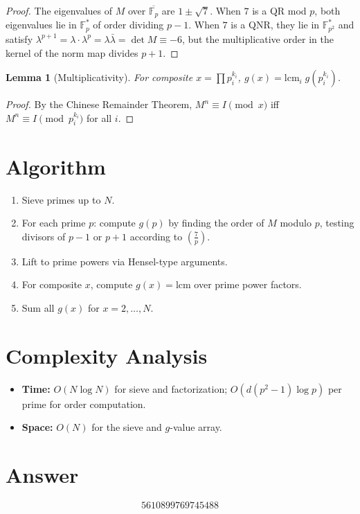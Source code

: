 \documentclass[12pt]{article}
\newtheorem{lemma}[theorem]{Lemma}
\begin{document}
\begin{proof}
The eigenvalues of $M$ over $\overline{\mathbb{F}_p}$ are $1 \pm \sqrt{7}$. When $7$ is a QR mod $p$, both eigenvalues lie in $\mathbb{F}_p^*$ of order dividing $p-1$. When $7$ is a QNR, they lie in $\mathbb{F}_{p^2}^*$ and satisfy $\lambda^{p+1} = \lambda \cdot \lambda^p = \lambda \bar{\lambda} = \det M \equiv -6$, but the multiplicative order in the kernel of the norm map divides $p+1$.
\end{proof}

\begin{lemma}[Multiplicativity]
For composite $x = \prod p_i^{k_i}$, $g(x) = \mathrm{lcm}_i\; g(p_i^{k_i})$.
\end{lemma}

\begin{proof}
By the Chinese Remainder Theorem, $M^n \equiv I \pmod{x}$ iff $M^n \equiv I \pmod{p_i^{k_i}}$ for all $i$.
\end{proof}

\section{Algorithm}

\begin{enumerate}
\item Sieve primes up to $N$.
\item For each prime $p$: compute $g(p)$ by finding the order of $M$ modulo $p$, testing divisors of $p-1$ or $p+1$ according to $\left(\frac{7}{p}\right)$.
\item Lift to prime powers via Hensel-type arguments.
\item For composite $x$, compute $g(x) = \mathrm{lcm}$ over prime power factors.
\item Sum all $g(x)$ for $x = 2, \ldots, N$.
\end{enumerate}

\section{Complexity Analysis}

\begin{itemize}
\item \textbf{Time:} $O(N \log N)$ for sieve and factorization; $O(d(p^2-1) \log p)$ per prime for order computation.
\item \textbf{Space:} $O(N)$ for the sieve and $g$-value array.
\end{itemize}

\section{Answer}

\[
\boxed{5610899769745488}
\]
\end{document}
